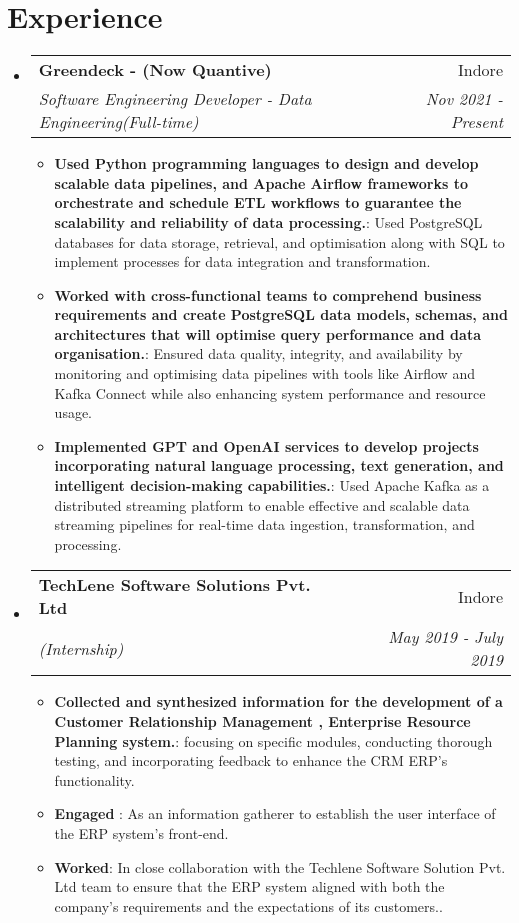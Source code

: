 \documentclass[a4paper,20pt]{article}
\makeatletter
\newcommand{\resumeItem}[2]{
  \item\small{
    \textbf{#1}{: #2 \vspace{-2pt}}
  }
}
\newcommand{\resumeSubheading}[4]{
  \vspace{-1pt}\item
    \begin{tabular*}{0.97\textwidth}{l@{\extracolsep{\fill}}r}
      \textbf{#1} & #2 \\
      \textit{#3} & \textit{#4} \\
    \end{tabular*}\vspace{-5pt}
}
\newcommand{\resumeSubHeadingListStart}{\begin{itemize}[leftmargin=*]}
\newcommand{\resumeSubHeadingListEnd}{\end{itemize}}
\newcommand{\resumeItemListStart}{\begin{itemize}}
\newcommand{\resumeItemListEnd}{\end{itemize}\vspace{-5pt}}
\makeatother
\begin{document}
\section{Experience}
  \resumeSubHeadingListStart
    \resumeSubheading{Greendeck - (Now Quantive)}{Indore}
    {Software Engineering Developer - Data Engineering(Full-time)}{Nov 2021 - Present}
    \resumeItemListStart
        \resumeItem{Used Python programming languages to design and develop scalable data pipelines, and Apache Airflow frameworks to orchestrate and schedule ETL workflows to guarantee the scalability and reliability of data processing.}
          {Used PostgreSQL databases for data storage, retrieval, and optimisation along
with SQL to implement processes for data integration and transformation.}
          \resumeItem{Worked with cross-functional teams to comprehend business requirements and create PostgreSQL data models, schemas, and architectures that will optimise query performance and data organisation.}
          {Ensured data quality, integrity, and availability by monitoring and optimising
data pipelines with tools like Airflow and Kafka Connect while also enhancing
system performance and resource usage.}
          \resumeItem{Implemented GPT and OpenAI services to develop projects incorporating natural language processing, text generation, and intelligent decision-making capabilities.}{Used Apache Kafka as a distributed streaming platform to enable effective and scalable data streaming pipelines for real-time data ingestion, transformation, and
processing.}

      \resumeItemListEnd
      
\vspace{-5pt}
    \resumeSubheading
		{TechLene Software Solutions Pvt. Ltd}{Indore}{(Internship)}{May 2019 -  July 2019}
		\resumeItemListStart
        \resumeItem{Collected and synthesized information for the development of a Customer Relationship Management , Enterprise Resource Planning system.}
          {focusing on specific modules, conducting thorough testing, and incorporating feedback to enhance the CRM ERP's functionality.}
        \resumeItem{Engaged }
          {As an information gatherer to establish the user interface of the ERP system's front-end.}
        \resumeItem{Worked}{In close collaboration with the Techlene Software Solution Pvt. Ltd team to ensure that the ERP system aligned with both the company's requirements and the expectations of its customers..}
		\resumeItemListEnd

\resumeSubHeadingListEnd
\end{document}
